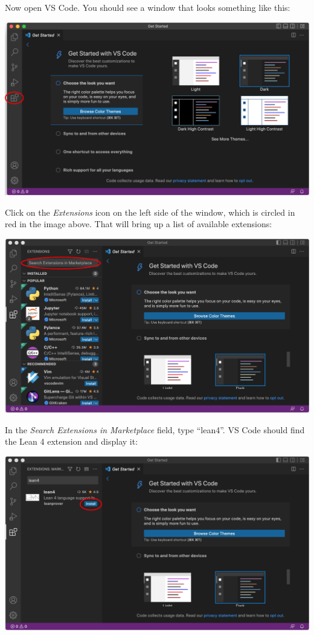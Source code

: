 \documentclass[
  letterpaper,
  DIV=11,
  numbers=noendperiod]{scrreprt}
\begin{document}
Now open VS Code. You should see a window that looks something like
this:

\includegraphics{./Images/VSCodeStart.png}

Click on the \emph{Extensions} icon on the left side of the window,
which is circled in red in the image above. That will bring up a list of
available extensions:

\includegraphics{./Images/FindExtension.png}

In the \emph{Search Extensions in Marketplace} field, type ``lean4''. VS
Code should find the Lean 4 extension and display it:

\includegraphics{./Images/InstallExtension.png}
\end{document}
